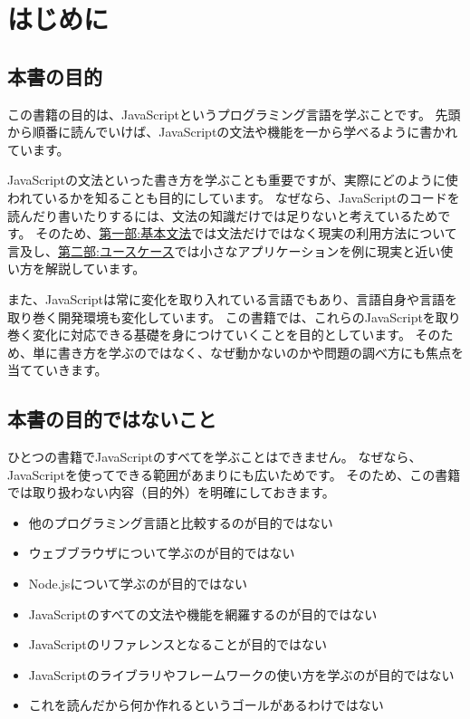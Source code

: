 \hypertarget{prolog}{%
\chapter*{はじめに}\label{prolog}}

\hypertarget{do}{%
\section*{本書の目的}\label{do}}

この書籍の目的は、JavaScriptというプログラミング言語を学ぶことです。
先頭から順番に読んでいけば、JavaScriptの文法や機能を一から学べるように書かれています。

JavaScriptの文法といった書き方を学ぶことも重要ですが、実際にどのように使われているかを知ることも目的にしています。
なぜなら、JavaScriptのコードを読んだり書いたりするには、文法の知識だけでは足りないと考えているためです。
そのため、\href{../basic/README.md}{第一部:基本文法}では文法だけではなく現実の利用方法について言及し、\href{../use-case/README.md}{第二部:ユースケース}では小さなアプリケーションを例に現実と近い使い方を解説しています。

また、JavaScriptは常に変化を取り入れている言語でもあり、言語自身や言語を取り巻く開発環境も変化しています。
この書籍では、これらのJavaScriptを取り巻く変化に対応できる基礎を身につけていくことを目的としています。
そのため、単に書き方を学ぶのではなく、なぜ動かないのかや問題の調べ方にも焦点を当てていきます。

\hypertarget{do-not}{%
\section*{本書の目的ではないこと}\label{do-not}}

ひとつの書籍でJavaScriptのすべてを学ぶことはできません。
なぜなら、JavaScriptを使ってできる範囲があまりにも広いためです。
そのため、この書籍では取り扱わない内容（目的外）を明確にしておきます。

\begin{itemize}
\item
  他のプログラミング言語と比較するのが目的ではない
\item
  ウェブブラウザについて学ぶのが目的ではない
\item
  Node.jsについて学ぶのが目的ではない
\item
  JavaScriptのすべての文法や機能を網羅するのが目的ではない
\item
  JavaScriptのリファレンスとなることが目的ではない
\item
  JavaScriptのライブラリやフレームワークの使い方を学ぶのが目的ではない
\item
  これを読んだから何か作れるというゴールがあるわけではない
\end{itemize}

